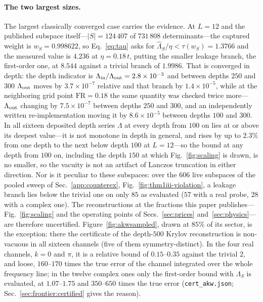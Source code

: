 \paragraph{The two largest sizes.} The largest classically converged case carries the evidence. At $L=12$ and the published subspace
itself---$\lvert S\rvert=124\,407$ of $731\,808$ determinants---the captured weight is
$w_S=0.998622$, so Eq.~\eqref{eq:tau} asks for $\widehat\Lambda_S/\eta<\tau(w_S)=1.3766$ and the
measured value is $4.236$ at $\eta=0.18\,t$, putting the smaller leakage branch, the first-order one, at $8.544$ against a trivial
branch of $1.9986$. That is converged in depth: the depth indicator is
$\Lambda_{\rm in}/\Lambda_{\rm out}=2.8\times10^{-3}$ and between depths $250$ and $300$ $\Lambda_{\rm out}$ moves by $3.7\times10^{-7}$ relative and that branch by $1.4\times10^{-5}$, while at the neighboring grid point $\mathrm{FR}=0.18$ the same
quantity was checked twice more---$\Lambda_{\rm out}$ changing by $7.5\times10^{-7}$ between depths
$250$ and $300$, and an independently written re-implementation moving it by $8.6\times10^{-5}$
between depths $100$ and $300$. In all sixteen deposited depth series $\Lambda$ at every depth from $100$ on lies at or above its deepest value---it is not monotone in depth in general, and rises by up to $2.3\%$ from one depth to the next below depth $100$ at $L=12$---so the bound at any depth from $100$ on, including the depth $150$ at which Fig.~\ref{fig:scaling} is drawn, is no smaller, so the vacuity is not an artifact of Lanczos truncation in either direction.
Nor is it peculiar to these subspaces: over the $606$
live subspaces of the pooled sweep of Sec.~\ref{app:counterex}, Fig.~\ref{fig:thm1iii-violation}, a
leakage branch lies below the trivial one on only $85$ as evaluated ($57$ with a real probe, $28$ with a complex one). The reconstructions at the fractions this paper publishes---Fig.~\ref{fig:scaling} and the operating points of Secs.~\ref{sec:prices} and~\ref{sec:physics}---are therefore uncertified. Figure~\ref{fig:akwsampled}, drawn at $85\%$ of its sector, is the exception: there the certificate of the depth-$500$ Krylov reconstruction is non-vacuous in all sixteen channels (five of them symmetry-distinct). In the four real channels, $k=0$ and $\pi$, it is a relative bound of $0.15$--$0.35$ against the trivial $2$, and loose, $160$--$170$ times the true error of the channel integrated over the whole frequency line; in the twelve complex ones only the first-order bound with $\Lambda_S$ is evaluated, at $1.07$--$1.75$ and $350$--$650$ times the true error (\texttt{cert\_akw.json}; Sec.~\ref{sec:frontier:certified} gives the reason).

